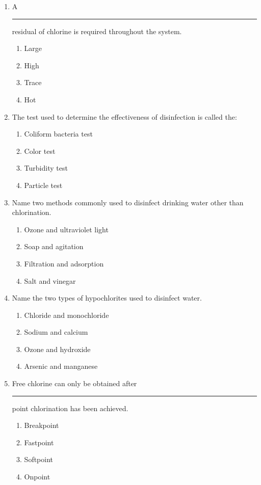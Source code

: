 \documentclass{article}
\begin{document}
\begin{enumerate}
\item A \rule{1cm}{0.5pt}  residual of chlorine is required throughout the system.
\begin{enumerate}
\item Large
\item High
\item Trace
\item Hot
\end{enumerate}

\item The test used to determine the effectiveness of disinfection is called the:
\begin{enumerate}
\item Coliform bacteria test
\item Color test
\item Turbidity test
\item Particle test
\end{enumerate}


\item Name two methods commonly used to disinfect drinking water other than chlorination.
\begin{enumerate}
\item Ozone and ultraviolet light
\item Soap and agitation
\item Filtration and adsorption
\item Salt and vinegar
\end{enumerate}

\item Name the two types of hypochlorites used to disinfect water.
\begin{enumerate}
\item Chloride and monochloride
\item Sodium and calcium
\item Ozone and hydroxide
\item Arsenic and manganese
\end{enumerate}

\item Free chlorine can only be obtained after \rule{1cm}{0.5pt}  point chlorination has been achieved.
\begin{enumerate}
\item Breakpoint
\item Fastpoint
\item Softpoint
\item Onpoint
\end{enumerate}


\end{enumerate}
\end{document}
